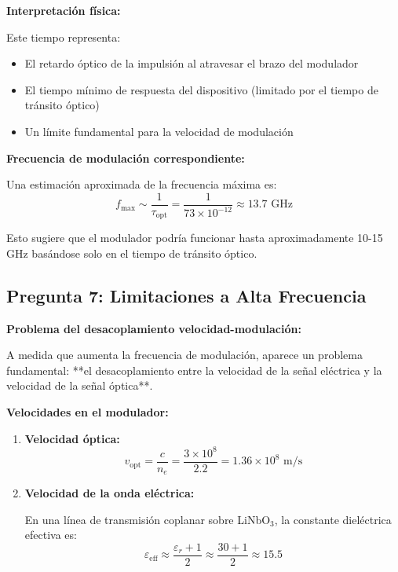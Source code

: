 \documentclass[12pt,a4paper]{article}
\begin{document}
\begin{enumerate}
\textbf{Interpretación física:}

Este tiempo representa:
\begin{itemize}
    \item El retardo óptico de la impulsión al atravesar el brazo del modulador
    \item El tiempo mínimo de respuesta del dispositivo (limitado por el tiempo de tránsito óptico)
    \item Un límite fundamental para la velocidad de modulación
\end{itemize}

\textbf{Frecuencia de modulación correspondiente:}

Una estimación aproximada de la frecuencia máxima es:
\begin{equation}
    f_{\text{max}} \sim \frac{1}{\tau_{\text{opt}}} = \frac{1}{73 \times 10^{-12}} \approx 13.7 \text{ GHz}
\end{equation}

Esto sugiere que el modulador podría funcionar hasta aproximadamente 10-15 GHz basándose solo en el tiempo de tránsito óptico.

\subsection{Pregunta 7: Limitaciones a Alta Frecuencia}

\textbf{Problema del desacoplamiento velocidad-modulación:}

A medida que aumenta la frecuencia de modulación, aparece un problema fundamental: **el desacoplamiento entre la velocidad de la señal eléctrica y la velocidad de la señal óptica**.

\textbf{Velocidades en el modulador:}

\begin{enumerate}
    \item \textbf{Velocidad óptica:}
    \begin{equation}
        v_{\text{opt}} = \frac{c}{n_e} = \frac{3 \times 10^8}{2.2} = 1.36 \times 10^8 \text{ m/s}
    \end{equation}
    
    \item \textbf{Velocidad de la onda eléctrica:}
    
    En una línea de transmisión coplanar sobre LiNbO$_3$, la constante dieléctrica efectiva es:
    \begin{equation}
        \varepsilon_{\text{eff}} \approx \frac{\varepsilon_r + 1}{2} \approx \frac{30 + 1}{2} \approx 15.5
    \end{equation}
    

\end{enumerate}
\end{enumerate}
\end{document}
